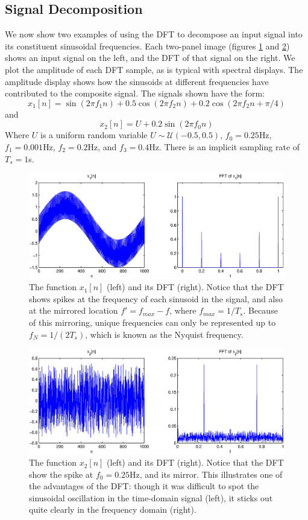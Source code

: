 \subsection{Signal Decomposition}
We now show two examples of using the DFT to decompose an input signal into its constituent sinusoidal frequencies. Each two-panel image (figures \ref{decomp1} and \ref{decomp2}) shows an input signal on the left, and the DFT of that signal on the right. We plot the amplitude of each DFT sample, as is typical with spectral displays. The amplitude display shows how the sinusoids at different frequencies have contributed to the composite signal. The signals shown have the form:
\[
x_1[n] = \sin(2\pi f_1 n) + 0.5\cos(2\pi f_2 n) +  0.2\cos(2\pi f_2 n + \pi/4)
\]
and
\[
x_2[n] = U +  0.2\sin(2\pi f_0 n)
\]
Where $U$ is a uniform random variable $U\sim \mathcal{U}(-0.5, 0.5)$, $f_0 = 0.25$Hz, $f_1=0.001$Hz, $f_2=0.2$Hz, and $f_3=0.4$Hz. There is an implicit sampling rate of $T_s = 1$s.

\begin{figure}
    \centering
    \includegraphics[scale=0.6]{./img/sins.eps}
    \caption{The function $x_1[n]$ (left) and its DFT (right). Notice that the DFT shows spikes at the frequency of each sinusoid in the signal, and also at the mirrored location $f'=f_{max}-f$, where $f_{max}=1/T_s$. Because of this mirroring, unique frequencies can only be represented up to $f_N=1/(2T_s)$, which is known as the Nyquist frequency.}
    \label{decomp1}
\end{figure}
\begin{figure}
    \centering
    \includegraphics[scale=0.6]{./img/random.eps}
    \caption{The function $x_2[n]$ (left) and its DFT (right). Notice that the DFT show the spike at $f_0=0.25$Hz, and its mirror. This illustrates one of the advantages of the DFT: though it was difficult to spot the sinusoidal oscillation in the time-domain signal (left), it sticks out quite clearly in the frequency domain (right).}
    \label{decomp2}
\end{figure}


